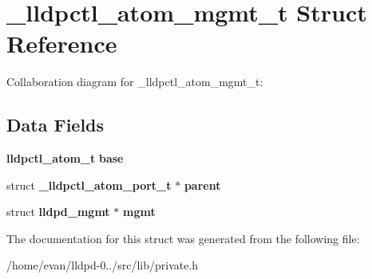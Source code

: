 \section{\-\_\-lldpctl\-\_\-atom\-\_\-mgmt\-\_\-t \-Struct \-Reference}
\label{struct__lldpctl__atom__mgmt__t}


\-Collaboration diagram for \-\_\-lldpctl\-\_\-atom\-\_\-mgmt\-\_\-t\-:
\subsection*{\-Data \-Fields}
\begin{DoxyCompactItemize}
\item 
{\bf lldpctl\-\_\-atom\-\_\-t} {\bfseries base}\label{struct__lldpctl__atom__mgmt__t_add397d02e5d3c1626944dc981febfa0f}

\item 
struct {\bf \-\_\-lldpctl\-\_\-atom\-\_\-port\-\_\-t} $\ast$ {\bfseries parent}\label{struct__lldpctl__atom__mgmt__t_a6b11064aa792e72fda7db80104928434}

\item 
struct {\bf lldpd\-\_\-mgmt} $\ast$ {\bfseries mgmt}\label{struct__lldpctl__atom__mgmt__t_a1530a778105840a2393295f2148499ac}

\end{DoxyCompactItemize}


\-The documentation for this struct was generated from the following file\-:\begin{DoxyCompactItemize}
\item 
/home/evan/lldpd-\/0../src/lib/private.\-h\end{DoxyCompactItemize}
